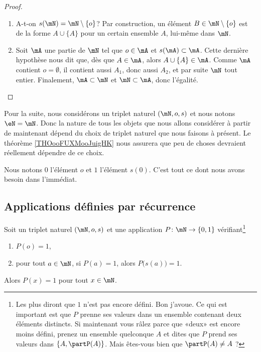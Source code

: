 \begin{proof}
\begin{subproof}
\begin{enumerate}
			\item A-t-on \( s( \mN ) = \mN \setminus \{ o \} \)? Par construction, un élément \( B \in  \mN \setminus \{ o \} \) est de la forme \( A \cup \{ A \} \) pour un certain ensemble \( A \), lui-même dans \( \mN \).
			\item Soit \( \mA \) une partie de \( \mN \) tel que \( o \in \mA \) et \( s(\mA) \subset \mA \). Cette dernière hypothèse nous dit que, dès que \( A \in \mA \), alors \( A \cup \{ A \} \in \mA \). Comme \( \mA \) contient \( o = \emptyset \), il contient aussi \( A_1 \), donc aussi \( A_2 \), et par suite \( \mN \) tout entier. Finalement, \( \mA \subset \mN \) et \( \mN \subset \mA \), donc l'égalité.
		\end{enumerate}
	\end{subproof}
\end{proof}

\begin{normaltext}[Définition de \( \eN\)]    \label{NORooDefinitionNChoixTriplet}
	Pour la suite, nous considérons un triplet naturel \( (\mN,o,s)\) et nous notons \( \eN=\mN\). Donc la nature de tous les objets que nous allons considérer à partir de maintenant dépend du choix de triplet naturel que nous faisons à présent. Le théorème \ref{THOooFUXMooJuigHK} nous assurera que peu de choses devraient réellement dépendre de ce choix.

	Nous notons \( 0\) l'élément \( o\) et \( 1\) l'élément \( s(0)\). C'est tout ce dont nous avons besoin dans l'immédiat.
\end{normaltext}

\subsection{Applications définies par récurrence}
\label{SUBooApplicationRecurrence}

\begin{proposition}      \label{PROPooXTRCooKwrWkq}
	Soit un triplet naturel \( (\mN,o,s)\) et une application \( P\colon \mN\to \{ 0,1 \}\) vérifiant\footnote{Les plus  diront que \( 1\) n'est pas encore défini. Bon j'avoue. Ce qui est important est que \( P\) prenne ses valeurs dans un ensemble contenant deux éléments distincts. Si maintenant vous râlez parce que «deux» est encore moins défini, prenez un ensemble quelconque \( A\) et dites que \( P\) prend ses valeurs dans \( \{ A, \partP(A)\}\). Mais êtes-vous bien  que \( \partP(A)\neq A\) ?}
	\begin{enumerate}
		\item
		      \( P(o)=1\),
		\item
		      pour tout \( a\in \mN\), si \( P(a)=1\), alors \( P\big( s(a) \big)=1\).
	\end{enumerate}
	Alors \( P(x)=1\) pour tout \( x\in \mN\).
\end{proposition}

